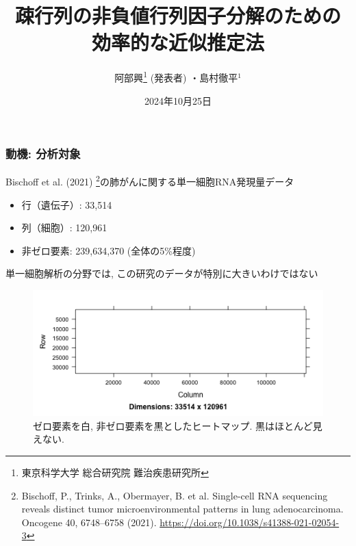 \documentclass[dvipdfmx, dvipsnames]{beamer}
\title{疎行列の非負値行列因子分解のための\\効率的な近似推定法}
\date{2024年10月25日}
\author {阿部興\footnote{東京科学大学 総合研究院 難治疾患研究所} (発表者)  ・島村徹平$^1$}
\begin{document}
\frame{
\titlepage
}


\begin{frame}
\frametitle{動機: 分析対象}
Bischoff et al. (2021)  \footnote{Bischoff, P., Trinks, A., Obermayer, B. et al. Single-cell RNA sequencing reveals distinct tumor microenvironmental patterns in lung adenocarcinoma. Oncogene 40, 6748–6758 (2021). \url{https://doi.org/10.1038/s41388-021-02054-3}}の肺がんに関する単一細胞RNA発現量データ
\begin{itemize}
\item 行（遺伝子）: 33,514
\item 列（細胞）: 120,961
\item 非ゼロ要素: 239,634,370 (全体の5\%程度)
\end{itemize}
単一細胞解析の分野では, この研究のデータが特別に大きいわけではない
\begin{figure}
\includegraphics[height=0.3\textheight, clip]{./img/heatmap.png}
\caption{ゼロ要素を白, 非ゼロ要素を黒としたヒートマップ. 黒はほとんど見えない.}
\end{figure}
\end{frame}
\end{document}
